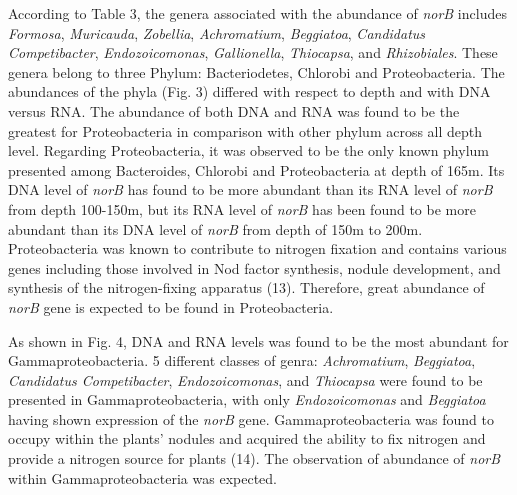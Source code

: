 \documentclass[11 pt,]{article}
\begin{document}
According to Table 3, the genera associated with the abundance of
\emph{norB} includes \emph{Formosa}, \emph{Muricauda}, \emph{Zobellia},
\emph{Achromatium}, \emph{Beggiatoa}, \emph{Candidatus Competibacter},
\emph{Endozoicomonas}, \emph{Gallionella}, \emph{Thiocapsa}, and
\emph{Rhizobiales}. These genera belong to three Phylum: Bacteriodetes,
Chlorobi and Proteobacteria. The abundances of the phyla (Fig. 3)
differed with respect to depth and with DNA versus RNA. The abundance of
both DNA and RNA was found to be the greatest for Proteobacteria in
comparison with other phylum across all depth level. Regarding
Proteobacteria, it was observed to be the only known phylum presented
among Bacteroides, Chlorobi and Proteobacteria at depth of 165m. Its DNA
level of \emph{norB} has found to be more abundant than its RNA level of
\emph{norB} from depth 100-150m, but its RNA level of \emph{norB} has
been found to be more abundant than its DNA level of \emph{norB} from
depth of 150m to 200m. Proteobacteria was known to contribute to
nitrogen fixation and contains various genes including those involved in
Nod factor synthesis, nodule development, and synthesis of the
nitrogen-fixing apparatus (13). Therefore, great abundance of
\emph{norB} gene is expected to be found in Proteobacteria.

As shown in Fig. 4, DNA and RNA levels was found to be the most abundant
for Gammaproteobacteria. 5 different classes of genra:
\emph{Achromatium}, \emph{Beggiatoa}, \emph{Candidatus Competibacter},
\emph{Endozoicomonas}, and \emph{Thiocapsa} were found to be presented
in Gammaproteobacteria, with only \emph{Endozoicomonas} and
\emph{Beggiatoa} having shown expression of the \emph{norB} gene.
Gammaproteobacteria was found to occupy within the plants' nodules and
acquired the ability to fix nitrogen and provide a nitrogen source for
plants (14). The observation of abundance of \emph{norB} within
Gammaproteobacteria was expected.
\end{document}
